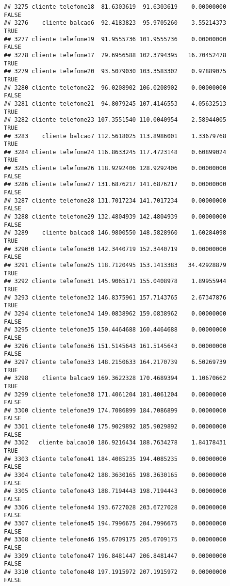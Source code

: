 \documentclass[
]{article}
\begin{document}
\begin{verbatim}
## 3275 cliente telefone18  81.6303619  91.6303619    0.00000000    FALSE
## 3276    cliente balcao6  92.4183823  95.9705260    3.55214373     TRUE
## 3277 cliente telefone19  91.9555736 101.9555736    0.00000000    FALSE
## 3278 cliente telefone17  79.6956588 102.3794395   16.70452478     TRUE
## 3279 cliente telefone20  93.5079030 103.3583302    0.97889075     TRUE
## 3280 cliente telefone22  96.0208902 106.0208902    0.00000000    FALSE
## 3281 cliente telefone21  94.8079245 107.4146553    4.05632513     TRUE
## 3282 cliente telefone23 107.3551540 110.0040954    2.58944005     TRUE
## 3283    cliente balcao7 112.5618025 113.8986001    1.33679768     TRUE
## 3284 cliente telefone24 116.8633245 117.4723148    0.60899024     TRUE
## 3285 cliente telefone26 118.9292406 128.9292406    0.00000000    FALSE
## 3286 cliente telefone27 131.6876217 141.6876217    0.00000000    FALSE
## 3287 cliente telefone28 131.7017234 141.7017234    0.00000000    FALSE
## 3288 cliente telefone29 132.4804939 142.4804939    0.00000000    FALSE
## 3289    cliente balcao8 146.9800550 148.5828960    1.60284098     TRUE
## 3290 cliente telefone30 142.3440719 152.3440719    0.00000000    FALSE
## 3291 cliente telefone25 118.7120495 153.1413383   34.42928879     TRUE
## 3292 cliente telefone31 145.9065171 155.0408978    1.89955944     TRUE
## 3293 cliente telefone32 146.8375961 157.7143765    2.67347876     TRUE
## 3294 cliente telefone34 149.0838962 159.0838962    0.00000000    FALSE
## 3295 cliente telefone35 150.4464688 160.4464688    0.00000000    FALSE
## 3296 cliente telefone36 151.5145643 161.5145643    0.00000000    FALSE
## 3297 cliente telefone33 148.2150633 164.2170739    6.50269739     TRUE
## 3298    cliente balcao9 169.3622328 170.4689394    1.10670662     TRUE
## 3299 cliente telefone38 171.4061204 181.4061204    0.00000000    FALSE
## 3300 cliente telefone39 174.7086899 184.7086899    0.00000000    FALSE
## 3301 cliente telefone40 175.9029892 185.9029892    0.00000000    FALSE
## 3302   cliente balcao10 186.9216434 188.7634278    1.84178431     TRUE
## 3303 cliente telefone41 184.4085235 194.4085235    0.00000000    FALSE
## 3304 cliente telefone42 188.3630165 198.3630165    0.00000000    FALSE
## 3305 cliente telefone43 188.7194443 198.7194443    0.00000000    FALSE
## 3306 cliente telefone44 193.6727028 203.6727028    0.00000000    FALSE
## 3307 cliente telefone45 194.7996675 204.7996675    0.00000000    FALSE
## 3308 cliente telefone46 195.6709175 205.6709175    0.00000000    FALSE
## 3309 cliente telefone47 196.8481447 206.8481447    0.00000000    FALSE
## 3310 cliente telefone48 197.1915972 207.1915972    0.00000000    FALSE

\end{verbatim}
\end{document}
